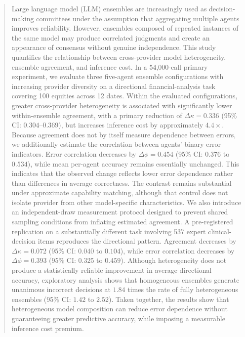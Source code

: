 \documentclass{ieeeaccess}
\begin{document}
\begin{abstract}
Large language model (LLM) ensembles are increasingly used as decision-making
committees under the assumption that aggregating multiple agents improves
reliability. However, ensembles composed of repeated instances of the same model
may produce correlated judgments and create an appearance of consensus without
genuine independence. This study quantifies the relationship between
cross-provider model heterogeneity, ensemble agreement, and inference cost. In a
54{,}000-call primary experiment, we evaluate three five-agent ensemble
configurations with increasing provider diversity on a directional
financial-analysis task covering 100 equities across 12 dates. Within the evaluated configurations, greater cross-provider
heterogeneity is associated with significantly lower within-ensemble agreement,
with a primary reduction of $\Delta\kappa=0.336$ (95\% CI: $0.304$--$0.369$), but increases
inference cost by approximately $4.4\times$. Because agreement does not by itself
measure dependence between errors, we additionally estimate the correlation
between agents' binary error indicators. Error correlation decreases by
$\Delta\phi = 0.454$ (95\% CI: $0.376$ to $0.534$), while mean per-agent accuracy
remains essentially unchanged. This indicates that the observed change reflects
lower error dependence rather than differences in average correctness.
The contrast remains substantial under approximate capability
matching, although that control does not isolate provider from other
model-specific characteristics.
We also introduce an independent-draw measurement protocol designed to prevent
shared sampling conditions from inflating estimated agreement. A pre-registered
replication on a substantially different task involving 537 expert
clinical-decision items reproduces the directional pattern. Agreement decreases by
$\Delta\kappa = 0.072$ (95\% CI: $0.040$ to $0.104$), while error correlation
decreases by $\Delta\phi = 0.393$ (95\% CI: $0.325$ to $0.459$). Although
heterogeneity does not produce a statistically reliable improvement in average
directional accuracy, exploratory analysis shows that homogeneous ensembles
generate unanimous incorrect decisions at $1.84$ times the rate of fully
heterogeneous ensembles (95\% CI: $1.42$ to $2.52$). Taken together, the results
show that heterogeneous model composition can reduce error dependence without
guaranteeing greater predictive accuracy, while imposing a measurable inference
cost premium.
\end{abstract}
\end{document}

